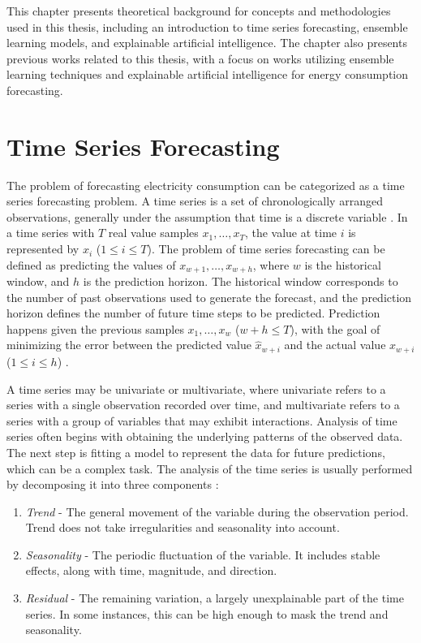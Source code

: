This chapter presents theoretical background for concepts and methodologies used in this thesis, including an introduction to time series forecasting, ensemble learning models, and explainable artificial intelligence. The chapter also presents previous works related to this thesis, with a focus on works utilizing ensemble learning techniques and explainable artificial intelligence for energy consumption forecasting.

\section{Time Series Forecasting}

The problem of forecasting electricity consumption can be categorized as a time series forecasting problem. A time series is a set of chronologically arranged observations, generally under the assumption that time is a discrete variable \cite{kirchgassner_introduction_2012}. In a time series with $T$ real value samples $x_1, \dots, x_T$, the value at time $i$ is represented by $x_i$ ($1 \leq i \leq T$). The problem of time series forecasting can be defined as predicting the values of $x_{w+1}, \dots, x_{w+h}$, where $w$ is the historical window, and $h$ is the prediction horizon. The historical window corresponds to the number of past observations used to generate the forecast, and the prediction horizon defines the number of future time steps to be predicted. Prediction happens given the previous samples $x_1, \dots, x_w$ ($w+h \leq T$), with the goal of minimizing the error between the predicted value $\hat{x}_{w+i}$ and the actual value $x_{w+i}$ ($1 \leq i \leq h$) \cite{divina_stacking_2018}.

A time series may be univariate or multivariate, where univariate refers to a series with a single observation recorded over time, and multivariate refers to a series with a group of variables that may exhibit interactions.
Analysis of time series often begins with obtaining the underlying patterns of the observed data. The next step is fitting a model to represent the data for future predictions, which can be a complex task. The analysis of the time series is usually performed by decomposing it into three components \cite{deb_review_2017,brockwell_introduction_2002}:
\begin{enumerate}
    \item \emph{Trend} \hyp{} The general movement of the variable during the observation period. Trend does not take irregularities and seasonality into account.
    \item \emph{Seasonality} \hyp{} The periodic fluctuation of the variable. It includes stable effects, along with time, magnitude, and direction.
    \item \emph{Residual} \hyp{} The remaining variation, a largely unexplainable part of the time series. In some instances, this can be high enough to mask the trend and seasonality.
\end{enumerate}

